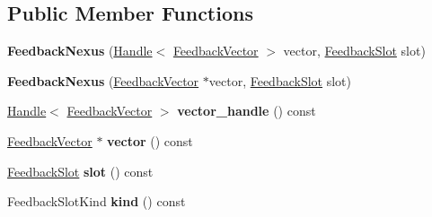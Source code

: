 \subsection*{Public Member Functions}
\begin{DoxyCompactItemize}
\item 
\mbox{\label{classv8_1_1internal_1_1FeedbackNexus_a804a3f263710315ed14a498fd93db438}} 
{\bfseries Feedback\+Nexus} (\mbox{\hyperlink{classv8_1_1internal_1_1Handle}{Handle}}$<$ \mbox{\hyperlink{classv8_1_1internal_1_1FeedbackVector}{Feedback\+Vector}} $>$ vector, \mbox{\hyperlink{classv8_1_1internal_1_1FeedbackSlot}{Feedback\+Slot}} slot)
\item 
\mbox{\label{classv8_1_1internal_1_1FeedbackNexus_aa175a9246bd757f9f8d9ef633f3cc5eb}} 
{\bfseries Feedback\+Nexus} (\mbox{\hyperlink{classv8_1_1internal_1_1FeedbackVector}{Feedback\+Vector}} $\ast$vector, \mbox{\hyperlink{classv8_1_1internal_1_1FeedbackSlot}{Feedback\+Slot}} slot)
\item 
\mbox{\label{classv8_1_1internal_1_1FeedbackNexus_a54a3b99af63380f05cfccb86bd2ff4f7}} 
\mbox{\hyperlink{classv8_1_1internal_1_1Handle}{Handle}}$<$ \mbox{\hyperlink{classv8_1_1internal_1_1FeedbackVector}{Feedback\+Vector}} $>$ {\bfseries vector\+\_\+handle} () const
\item 
\mbox{\label{classv8_1_1internal_1_1FeedbackNexus_aac2518489890b11a0cceede7139ed400}} 
\mbox{\hyperlink{classv8_1_1internal_1_1FeedbackVector}{Feedback\+Vector}} $\ast$ {\bfseries vector} () const
\item 
\mbox{\label{classv8_1_1internal_1_1FeedbackNexus_a76df847f2cfa089c9be1bc29841479d0}} 
\mbox{\hyperlink{classv8_1_1internal_1_1FeedbackSlot}{Feedback\+Slot}} {\bfseries slot} () const
\item 
\mbox{\label{classv8_1_1internal_1_1FeedbackNexus_a2a797a98a612c3f58f072f24a64082a5}} 
Feedback\+Slot\+Kind {\bfseries kind} () const
\item 
\mbox{\label{classv8_1_1internal_1_1FeedbackNexus_a5dfcc44bbba6b3b231e088efbea2d475}} 

\end{DoxyCompactItemize}
